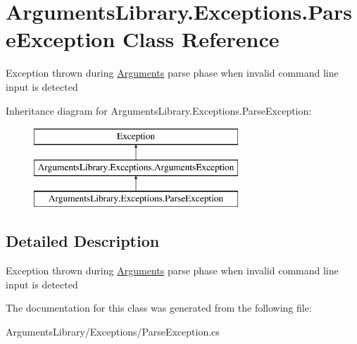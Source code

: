\hypertarget{class_arguments_library_1_1_exceptions_1_1_parse_exception}{\section{Arguments\+Library.\+Exceptions.\+Parse\+Exception Class Reference}
\label{class_arguments_library_1_1_exceptions_1_1_parse_exception}
}


Exception thrown during \hyperlink{class_arguments_library_1_1_arguments}{Arguments} parse phase when invalid command line input is detected  


Inheritance diagram for Arguments\+Library.\+Exceptions.\+Parse\+Exception\+:\begin{figure}[H]
\begin{center}
\leavevmode
\includegraphics[height=3.000000cm]{da/dd1/class_arguments_library_1_1_exceptions_1_1_parse_exception}
\end{center}
\end{figure}


\subsection{Detailed Description}
Exception thrown during \hyperlink{class_arguments_library_1_1_arguments}{Arguments} parse phase when invalid command line input is detected 



The documentation for this class was generated from the following file\+:\begin{DoxyCompactItemize}
\item 
Arguments\+Library/\+Exceptions/Parse\+Exception.\+cs\end{DoxyCompactItemize}
